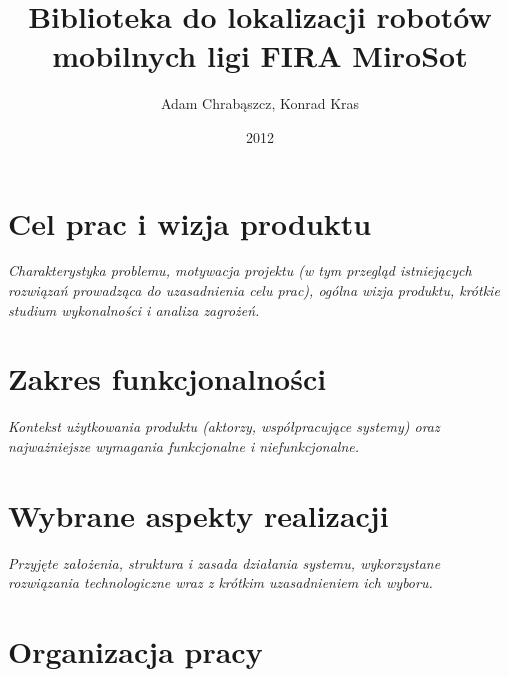 \documentclass[polish,12pt]{aghthesis}
\author{Adam Chrabąszcz, Konrad Kras}
\title{Biblioteka do lokalizacji robotów mobilnych ligi FIRA MiroSot}
\date{2012}
\begin{document}
\maketitle



\section{Cel prac i wizja produktu}
\label{sec:cel-wizja}
\emph{Charakterystyka problemu, motywacja projektu (w tym przegląd
  istniejących rozwiązań prowadząca do uzasadnienia celu prac), ogólna
  wizja produktu, krótkie studium wykonalności i analiza zagrożeń.}

\section{Zakres funkcjonalności}
\label{sec:zakres-funkcjonalnosci}

\emph{Kontekst użytkowania produktu (aktorzy, współpracujące systemy)
  oraz najważniejsze wymagania funkcjonalne i niefunkcjonalne.}

\section{Wybrane aspekty realizacji}
\label{sec:wybrane-aspekty-realizacji}

\emph{Przyjęte założenia, struktura i zasada działania systemu,
  wykorzystane rozwiązania technologiczne wraz z krótkim uzasadnieniem
  ich wyboru.}

\section{Organizacja pracy}
\label{sec:organizacja-pracy}
\end{document}
